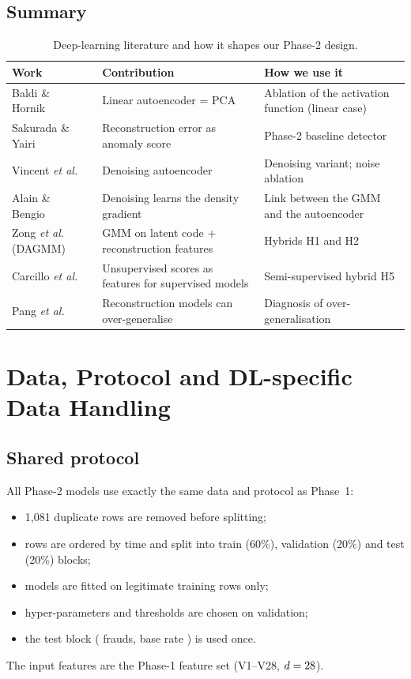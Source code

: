 \documentclass[12pt]{article}
\begin{document}
\subsection{Summary}
\begin{table}[H]
\centering\small
\caption{Deep-learning literature and how it shapes our Phase-2 design.}
\label{tab:lit}
\begin{tabularx}{\linewidth}{@{}l X X@{}}
\toprule
\textbf{Work} & \textbf{Contribution} & \textbf{How we use it}\\
\midrule
Baldi \& Hornik~\cite{baldi1989} & Linear autoencoder = PCA & Ablation of the activation function (linear case)\\
Sakurada \& Yairi~\cite{sakurada2014} & Reconstruction error as anomaly score & Phase-2 baseline detector\\
Vincent \emph{et al.}~\cite{vincent2008} & Denoising autoencoder & Denoising variant; noise ablation\\
Alain \& Bengio~\cite{alain2014} & Denoising learns the density gradient & Link between the GMM and the autoencoder\\
Zong \emph{et al.}~\cite{zong2018} (DAGMM) & GMM on latent code + reconstruction features & Hybrids H1 and H2\\
Carcillo \emph{et al.}~\cite{carcillo2021} & Unsupervised scores as features for supervised models & Semi-supervised hybrid H5\\
Pang \emph{et al.}~\cite{pang2021} & Reconstruction models can over-generalise & Diagnosis of over-generalisation\\
\bottomrule
\end{tabularx}
\end{table}

\section{Data, Protocol and DL-specific Data Handling}\label{sec:data}

\subsection{Shared protocol}
All Phase-2 models use exactly the same data and protocol as Phase~1:
\begin{itemize}
\item 1{,}081 duplicate rows are removed before splitting;
\item rows are ordered by time and split into train (60\%), validation (20\%) and test (20\%) blocks;
\item models are fitted on legitimate training rows only;
\item hyper-parameters and thresholds are chosen on validation;
\item the test block (\testFraud{} frauds, base rate \testRate) is used once.
\end{itemize}
The input features are the Phase-1 feature set (V1--V28, $d=28$).
\end{document}
